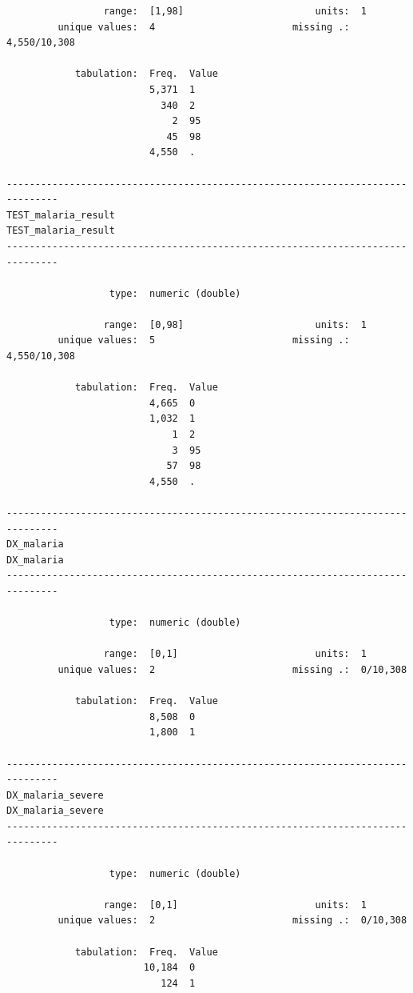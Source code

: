 \documentclass[
  letterpaper,
  DIV=11,
  numbers=noendperiod]{scrreprt}
\begin{document}
\begin{verbatim}
                 range:  [1,98]                       units:  1
         unique values:  4                        missing .:  4,550/10,308

            tabulation:  Freq.  Value
                         5,371  1
                           340  2
                             2  95
                            45  98
                         4,550  .

-------------------------------------------------------------------------------
TEST_malaria_result                                         TEST_malaria_result
-------------------------------------------------------------------------------

                  type:  numeric (double)

                 range:  [0,98]                       units:  1
         unique values:  5                        missing .:  4,550/10,308

            tabulation:  Freq.  Value
                         4,665  0
                         1,032  1
                             1  2
                             3  95
                            57  98
                         4,550  .

-------------------------------------------------------------------------------
DX_malaria                                                           DX_malaria
-------------------------------------------------------------------------------

                  type:  numeric (double)

                 range:  [0,1]                        units:  1
         unique values:  2                        missing .:  0/10,308

            tabulation:  Freq.  Value
                         8,508  0
                         1,800  1

-------------------------------------------------------------------------------
DX_malaria_severe                                             DX_malaria_severe
-------------------------------------------------------------------------------

                  type:  numeric (double)

                 range:  [0,1]                        units:  1
         unique values:  2                        missing .:  0/10,308

            tabulation:  Freq.  Value
                        10,184  0
                           124  1


\end{verbatim}
\end{document}
